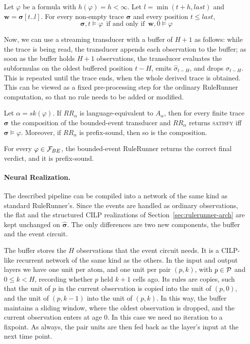 \begin{lemma}
\label{lem:horizon-locality}
Let $\varphi$ be a formula with $h(\varphi)=h<\infty$. Let $l=\min(t+h,last)$ and $\boldsymbol{w}=\boldsymbol{\sigma}[t..l]$. For every non-empty trace $\boldsymbol{\sigma}$ and every position $t\leq last$,
\[
\boldsymbol{\sigma},t\models\varphi
\,\text{ if and only if } \,
\boldsymbol{w},0\models\varphi
\]
\end{lemma}

Now, we can use a streaming transducer with a buffer of $H+1$ as follows: while the trace is being read, the transducer appends each observation to the buffer; as soon as the buffer holds $H+1$ observations, the transducer evaluates the subformulas on the oldest buffered position $t-H$, emits $\hat{\sigma}_{t-H}$, and drops $\sigma_{t-H}$. This is repeated until the trace ends, when the whole derived trace is obtained. This can be viewed as a fixed pre-processing step for the ordinary RuleRunner computation, so that no rule needs to be added or modified.

\begin{theorem}
\label{thm:rulerunner-bounded-correct}
Let $\alpha = sk(\varphi)$. If $RR_\alpha$ is language-equivalent to $A_\alpha$, then for every finite trace $\boldsymbol{\sigma}$ the composition of the bounded-event transducer and $RR_\alpha$ returns \textsc{satisfy} iff $\boldsymbol{\sigma}\models\varphi$. Moreover, if $RR_\alpha$ is prefix-sound, then so is the composition.
\end{theorem}


\begin{corollary}
\label{cor:rulerunner-bounded-fragment}
For every $\varphi\in{\ensuremath{\mathcal{F}}}_{BE}$, the bounded-event RuleRunner returns the correct final verdict, and it is prefix-sound.
\end{corollary}


\paragraph{Neural Realization.}
The described pipeline can be compiled into a network of the same kind as standard RuleRunner's. Since the events are handled as ordinary observations, the flat and the structured CILP realizations of Section~\ref{sec:rulerunner-arch} are kept unchanged on $\widehat{\boldsymbol{\sigma}}$. The only differences are two new components, the buffer and the event circuit.

The buffer stores the $H$ observations that the event circuit needs. It is a CILP-like recurrent network of the same kind as the others. In the input and output layers we have one unit per atom, and one unit per pair $(p,k)$, with $p\in{\ensuremath{\mathcal{P}}}$ and $0\leq k<H$, recording whether $p$ held $k+1$ cells ago. Its rules are copies, such that the unit of $p$ in the current observation is copied into the unit of $(p,0)$, and the unit of $(p,k-1)$ into the unit of $(p,k)$. In this way, the buffer maintains a sliding window, where the oldest observation is dropped, and the current observation enters at age $0$. In this case we need no iteration to a fixpoint. As always, the pair units are then fed back as the layer's input at the next time point.

